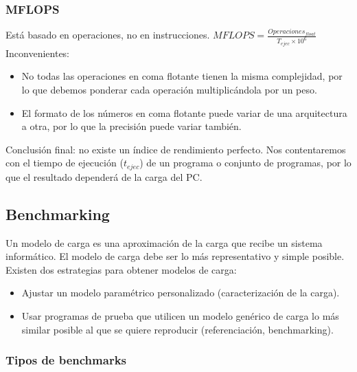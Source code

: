 \documentclass[12pt,spanish]{article}
\begin{document}
\subsubsection{MFLOPS}

Está basado en operaciones, no en instrucciones.
$
MFLOPS=\frac{Operaciones_{float}}{T_{ejec} \times 10^6}
$
Inconvenientes:
\begin{itemize}
	\item No todas las operaciones en coma flotante tienen la misma complejidad, por lo que debemos ponderar cada operación multiplicándola por un peso.
	\item El formato de los números en coma flotante puede variar de una arquitectura a otra, por lo que la precisión puede variar también.
\end{itemize}
Conclusión final: no existe un índice de rendimiento perfecto. Nos contentaremos con el tiempo de ejecución ($t_{ejec}$) de un programa o conjunto de programas, por lo que el resultado dependerá de la carga del PC.

\subsection{Benchmarking}

Un modelo de carga es una aproximación de la carga que recibe un sistema informático. El modelo de carga debe ser lo más representativo y simple posible. Existen dos estrategias para obtener modelos de carga:
\begin{itemize}
	\item Ajustar un modelo paramétrico personalizado (caracterización de la carga).
	\item Usar programas de prueba que utilicen un modelo genérico de carga lo más similar posible al que se quiere reproducir (referenciación, benchmarking).
\end{itemize}

\subsubsection{Tipos de benchmarks}
\end{document}
